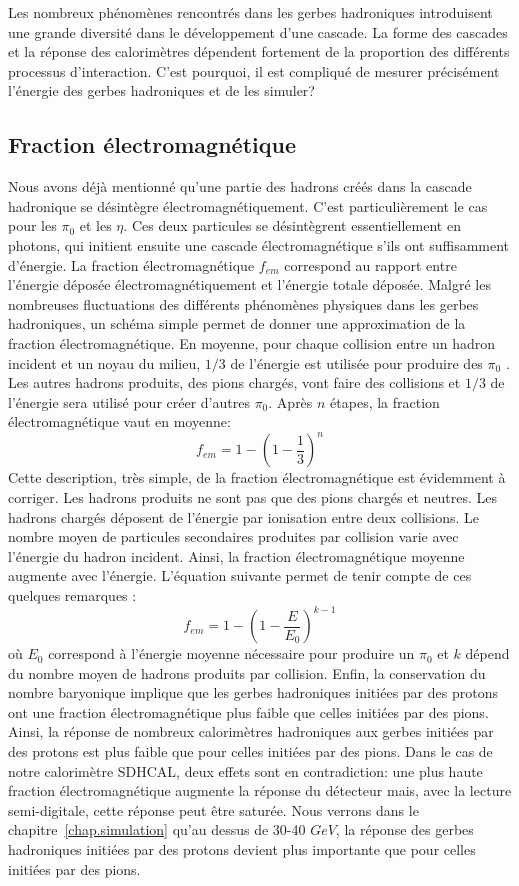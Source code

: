 Les nombreux phénomènes rencontrés dans les gerbes hadroniques introduisent une grande diversité dans le développement d'une cascade. La forme des cascades et la réponse des calorimètres dépendent fortement de la proportion des différents processus d'interaction. C'est pourquoi, il est compliqué de mesurer précisément l'énergie des gerbes hadroniques et de les simuler?

\subsection{Fraction électromagnétique}
\label{sec.fem}
Nous avons déjà mentionné qu'une partie des hadrons créés dans la cascade hadronique se désintègre électromagnétiquement. C'est particulièrement le cas pour les $\pi_0$ et les $\eta$. Ces deux particules se désintègrent essentiellement en photons, qui initient ensuite une cascade électromagnétique s'ils ont suffisamment d'énergie. La fraction électromagnétique $f_{em}$ correspond au rapport entre l'énergie déposée électromagnétiquement et l'énergie totale déposée. Malgré les nombreuses fluctuations des différents phénomènes physiques dans les gerbes hadroniques, un schéma simple permet de donner une approximation de la fraction électromagnétique. En moyenne, pour chaque collision entre un hadron incident et un noyau du milieu, $1/3$ de l'énergie est utilisée pour produire des $\pi_0$ \cite{Gabriel}. Les autres hadrons produits, des pions chargés, vont faire des collisions et $1/3$ de l'énergie sera utilisé pour créer d'autres $\pi_0$. Après $n$ étapes, la fraction électromagnétique vaut en moyenne:
\begin{equation}
  f_{em}=1-(1-\frac{1}{3})^n
\end{equation}
Cette description, très simple, de la fraction électromagnétique est évidemment à corriger. Les hadrons produits ne sont pas que des pions chargés et neutres. Les hadrons chargés déposent de l'énergie par ionisation entre deux collisions. Le nombre moyen de particules secondaires produites par collision varie avec l'énergie du hadron incident. Ainsi, la fraction électromagnétique moyenne augmente avec l'énergie. L'équation suivante permet de tenir compte de ces quelques remarques \cite{Gabriel}:
\begin{equation}
  f_{em}=1-(1-\frac{E}{E_0})^{k-1}
\end{equation}
où $E_0$ correspond à l’énergie moyenne nécessaire pour produire un $\pi_0$ et $k$ dépend du nombre moyen de hadrons produits par collision. 
Enfin, la conservation du nombre baryonique implique que les gerbes hadroniques initiées par des protons ont une fraction électromagnétique plus faible que celles initiées par des pions. Ainsi, la réponse de nombreux calorimètres hadroniques aux gerbes initiées par des protons est plus faible que pour celles initiées par des pions. Dans le cas de notre calorimètre SDHCAL, deux effets sont en contradiction: une plus haute fraction électromagnétique augmente la réponse du détecteur mais, avec la lecture semi-digitale, cette réponse peut être saturée. Nous verrons dans le chapitre~\ref{chap.simulation} qu'au dessus de 30-40 $GeV$, la réponse des gerbes hadroniques initiées par des protons devient plus importante que pour celles initiées par des pions.

